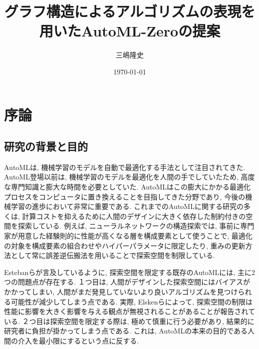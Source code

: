 \documentclass[11pt,oneside,openany,report]{jsbook}
\title{グラフ構造によるアルゴリズムの表現を用いたAutoML-Zeroの提案}
\author{三嶋隆史}
\date{\today}
\begin{document}
\maketitle

\chapter{序論}\label{chap:intr}

\section{研究の背景と目的}\label{sec:intr:background}

AutoMLは, 機械学習のモデルを自動で最適化する手法として注目されてきた. AutoML登場以前は, 機械学習のモデルを最適化を人間の手でしていたため, 高度な専門知識と膨大な時間を必要としていた. AutoMLはこの膨大にかかる最適化プロセスをコンピュータに置き換えることを目指してきた分野であり\cite{Fahlman_1989}\cite{Hutter_2011}\cite{Finn_2017}, 今後の機械学習の進歩において非常に重要である. これまでのAutoMLに関する研究の多くは, 計算コストを抑えるために人間のデザインに大きく依存した制約付きの空間を探索している. 例えば, ニューラルネットワークの構造探索では, 事前に専門家が用意した経験則的に性能が高くなる層を構成要素として使うことで, 最適化の対象を構成要素の組合わせやハイパーパラメータに限定したり, 重みの更新方法として常に誤差逆伝搬法を用いることで探索空間を制限している\cite{Zoph_2016}\cite{Real_2019}\cite{Tan_2019}.

Estebanらが言及しているように, 探索空間を限定する既存のAutoMLには, 主に2つの問題点が存在する\cite{automl_zero}. １つ目は, 人間がデザインした探索空間にはバイアスがかかってしまい, 人間がまだ発見していないより良いアルゴリズムを見つけられる可能性が減少してしまう点である. 実際, Elskenらによって, 探索空間の制限は性能に影響を大きく影響を与える観点が無視されることがあることが報告されている\cite{Yang_2019}. ２つ目は探索空間を限定する際は, 極めて慎重に行う必要があり\cite{Zoph_2018}\cite{So_2019}\cite{Negrinho_2019}, 結果的に研究者に負担が掛かってしまう点である. これは, AutoMLの本来の目的である人間の介入を最小限にするという点に反する.
\end{document}
